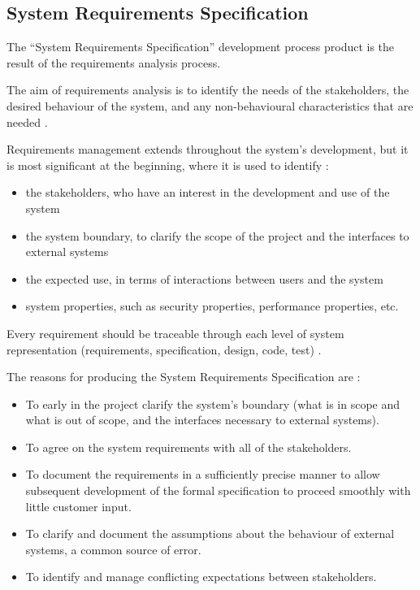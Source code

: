 \subsection{System Requirements Specification}

The ``System Requirements Specification'' development process product is the result
of the requirements analysis process.

The aim of requirements analysis is to identify the needs of the stakeholders, 
the desired behaviour of the system, and any non-behavioural characteristics that are needed \parencite{Tokeneer}. 

Requirements management extends throughout the system's development, but it is 
most significant at the beginning, where it is used to identify \parencite{Tokeneer}:
\begin{itemize}
	\item the stakeholders, who have an interest in the development and use of the system
	\item the system boundary, to clarify the scope of the project and the interfaces to external systems
	\item the expected use, in terms of interactions between users and the system
	\item system properties, such as security properties, performance properties, etc.
\end{itemize}

Every requirement should be traceable through each level of system representation (requirements, specification, design, code, test) \parencite{Tokeneer}.

The reasons for producing the System Requirements Specification are \parencite{Tokeneer}:
\begin{itemize}
	\item To early in the project clarify the system's boundary (what is in scope 
		and what is out of scope, and the interfaces necessary to external systems).
	\item To agree on the system requirements with all of the stakeholders.
	\item To document the requirements in a sufficiently precise manner to allow 
		subsequent development of the formal specification to proceed smoothly with 
		little customer input.
	\item To clarify and document the assumptions about the behaviour of external 
		systems, a common source of error.
	\item To identify and manage conflicting expectations between stakeholders.
\end{itemize}

